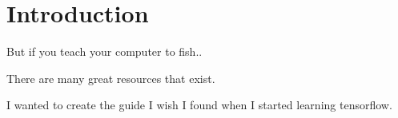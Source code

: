 \chapter{Introduction}

But if you teach your computer to fish..


There are many great resources that exist.

I wanted to create the guide I wish I found when I started learning tensorflow.

